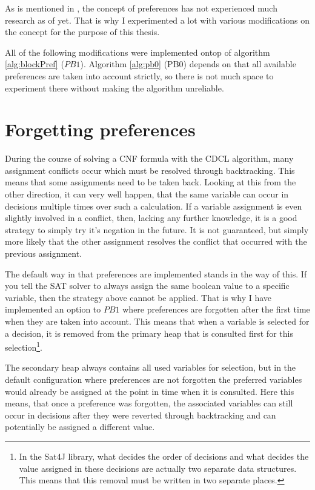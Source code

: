 As is mentioned in \cite{PJ18}, the concept of preferences has not experienced much research as of yet. That is why I experimented a lot with various modifications on the concept for the purpose of this thesis.

All of the following modifications were implemented ontop of algorithm \ref{alg:blockPref} ($PB1$). Algorithm \ref{alg:pb0} (PB0) depends on that all available preferences are taken into account strictly, so there is not much space to experiment there without making the algorithm unreliable. 


\section{Forgetting preferences}
During the course of solving a CNF formula with the CDCL algorithm, many assignment conflicts occur which must be resolved through backtracking. This means that some assignments need to be taken back. Looking at this from the other direction, it can very well happen, that the same variable can occur in decisions multiple times over such a calculation. If a variable assignment is even slightly involved in a conflict, then, lacking any further knowledge, it is a good strategy to simply try it's negation in the future. It is not guaranteed, but simply more likely that the other assignment resolves the conflict that occurred with the previous assignment. 

The default way in that preferences are implemented stands in the way of this. If you tell the SAT solver to always assign the same boolean value to a specific variable, then the strategy above cannot be applied. That is why I have implemented an option to $PB1$ where preferences are forgotten after the first time when they are taken into account. This means that when a variable is selected for a decision, it is removed from the primary heap that is consulted first for this selection\footnote{
	In the Sat4J library, what decides the order of decisions and what decides the value assigned in these decisions are actually two separate data structures. This means that this removal must be written in two separate places.
}. 

The secondary heap always contains all used variables for selection, but in the default configuration where preferences are not forgotten the preferred variables would already be assigned at the point in time when it is consulted. Here this means, that once a preference was forgotten, the associated variables can still occur in decisions after they were reverted through backtracking and can potentially be assigned a different value. 

